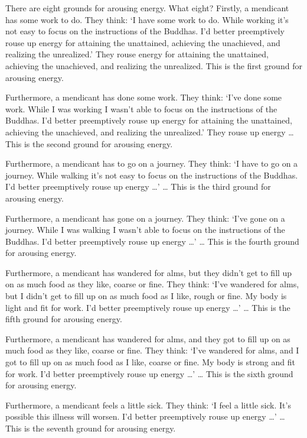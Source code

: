 \documentclass[12pt,openany]{book}%
\begin{document}
There are eight grounds for arousing energy. What eight? Firstly, a mendicant has some work to do. They think: ‘I have some work to do. While working it’s not easy to focus on the instructions of the Buddhas. I’d better preemptively rouse up energy for attaining the unattained, achieving the unachieved, and realizing the unrealized.’ They rouse energy for attaining the unattained, achieving the unachieved, and realizing the unrealized. This is the first ground for arousing energy. 

Furthermore, a mendicant has done some work. They think: ‘I’ve done some work. While I was working I wasn’t able to focus on the instructions of the Buddhas. I’d better preemptively rouse up energy for attaining the unattained, achieving the unachieved, and realizing the unrealized.’ They rouse up energy … This is the second ground for arousing energy. 

Furthermore, a mendicant has to go on a journey. They think: ‘I have to go on a journey. While walking it’s not easy to focus on the instructions of the Buddhas. I’d better preemptively rouse up energy …’ … This is the third ground for arousing energy. 

Furthermore, a mendicant has gone on a journey. They think: ‘I’ve gone on a journey. While I was walking I wasn’t able to focus on the instructions of the Buddhas. I’d better preemptively rouse up energy …’ … This is the fourth ground for arousing energy. 

Furthermore, a mendicant has wandered for alms, but they didn’t get to fill up on as much food as they like, coarse or fine. They think: ‘I’ve wandered for alms, but I didn’t get to fill up on as much food as I like, rough or fine. My body is light and fit for work. I’d better preemptively rouse up energy …’ … This is the fifth ground for arousing energy. 

Furthermore, a mendicant has wandered for alms, and they got to fill up on as much food as they like, coarse or fine. They think: ‘I’ve wandered for alms, and I got to fill up on as much food as I like, coarse or fine. My body is strong and fit for work. I’d better preemptively rouse up energy …’ … This is the sixth ground for arousing energy. 

Furthermore, a mendicant feels a little sick. They think: ‘I feel a little sick. It’s possible this illness will worsen. I’d better preemptively rouse up energy …’ … This is the seventh ground for arousing energy. 
\end{document}
